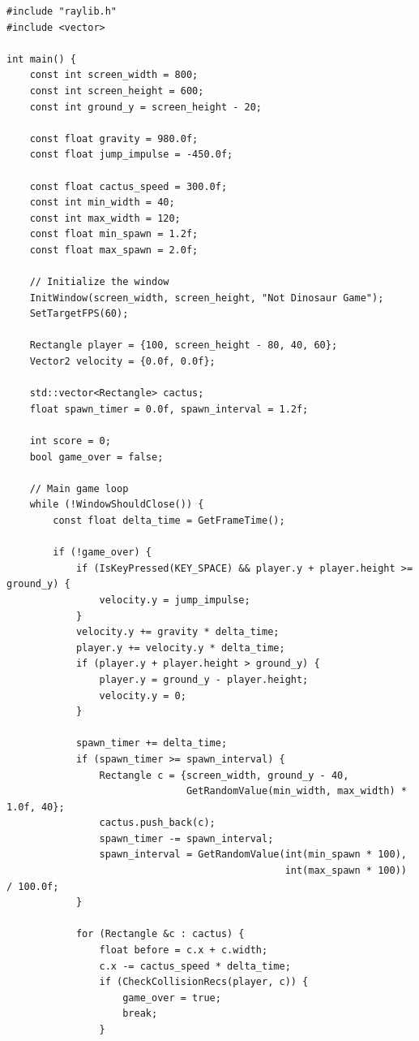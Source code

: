 \begin{verbatim}
#include "raylib.h"
#include <vector>

int main() {
    const int screen_width = 800;
    const int screen_height = 600;
    const int ground_y = screen_height - 20;

    const float gravity = 980.0f;
    const float jump_impulse = -450.0f;

    const float cactus_speed = 300.0f;
    const int min_width = 40;
    const int max_width = 120;
    const float min_spawn = 1.2f;
    const float max_spawn = 2.0f;

    // Initialize the window
    InitWindow(screen_width, screen_height, "Not Dinosaur Game");
    SetTargetFPS(60);

    Rectangle player = {100, screen_height - 80, 40, 60};
    Vector2 velocity = {0.0f, 0.0f};

    std::vector<Rectangle> cactus;
    float spawn_timer = 0.0f, spawn_interval = 1.2f;

    int score = 0;
    bool game_over = false;

    // Main game loop
    while (!WindowShouldClose()) {
        const float delta_time = GetFrameTime();

        if (!game_over) {
            if (IsKeyPressed(KEY_SPACE) && player.y + player.height >= ground_y) {
                velocity.y = jump_impulse;
            }
            velocity.y += gravity * delta_time;
            player.y += velocity.y * delta_time;
            if (player.y + player.height > ground_y) {
                player.y = ground_y - player.height;
                velocity.y = 0;
            }

            spawn_timer += delta_time;
            if (spawn_timer >= spawn_interval) {
                Rectangle c = {screen_width, ground_y - 40,
                               GetRandomValue(min_width, max_width) * 1.0f, 40};
                cactus.push_back(c);
                spawn_timer -= spawn_interval;
                spawn_interval = GetRandomValue(int(min_spawn * 100),
                                                int(max_spawn * 100)) / 100.0f;
            }

            for (Rectangle &c : cactus) {
                float before = c.x + c.width;
                c.x -= cactus_speed * delta_time;
                if (CheckCollisionRecs(player, c)) {
                    game_over = true;
                    break;
                }


\end{verbatim}
